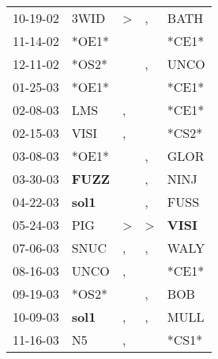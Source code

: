 \begin{supertabular}{p{0.07\textwidth}p{0.06\textwidth}p{0.02\textwidth}p{0.02\textwidth}p{0.06\textwidth}}
 10-19-02\textsuperscript{} &           3WID\textsuperscript{} &     \textgreater &             , &           BATH\textsuperscript{} \\
 11-14-02\textsuperscript{} &                            *OE1* &                  &               &                            *CE1* \\
 12-11-02\textsuperscript{} &                            *OS2* &                  &             , &           UNCO\textsuperscript{} \\
 01-25-03\textsuperscript{} &                            *OE1* &                  &               &                            *CE1* \\
 02-08-03\textsuperscript{} &            LMS\textsuperscript{} &                , &               &                            *CE1* \\
 02-15-03\textsuperscript{} &           VISI\textsuperscript{} &                , &               &                            *CS2* \\
 03-08-03\textsuperscript{} &                            *OE1* &                  &             , &           GLOR\textsuperscript{} \\
 03-30-03\textsuperscript{} &  \textbf{FUZZ\textsuperscript{}} &                  &             , &           NINJ\textsuperscript{} \\
 04-22-03\textsuperscript{} &  \textbf{sol1\textsuperscript{}} &                  &             , &           FUSS\textsuperscript{} \\
 05-24-03\textsuperscript{} &            PIG\textsuperscript{} &     \textgreater &  \textgreater &  \textbf{VISI\textsuperscript{}} \\
 07-06-03\textsuperscript{} &           SNUC\textsuperscript{} &                , &             , &           WALY\textsuperscript{} \\
 08-16-03\textsuperscript{} &           UNCO\textsuperscript{} &                , &               &                            *CE1* \\
 09-19-03\textsuperscript{} &                            *OS2* &                  &             , &            BOB\textsuperscript{} \\
 10-09-03\textsuperscript{} &  \textbf{sol1\textsuperscript{}} &                , &             , &           MULL\textsuperscript{} \\
 11-16-03\textsuperscript{} &             N5\textsuperscript{} &                , &               &                            *CS1* \\

\end{supertabular}
